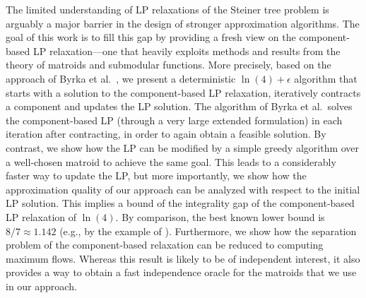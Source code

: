 \documentclass[11pt, letterpaper]{article}
\theoremstyle{definition}
\begin{document}
The limited understanding of LP relaxations of the
Steiner tree problem is arguably a major barrier in the design
of stronger approximation algorithms.
The goal of this work is to fill this gap by providing a fresh
view on the component-based LP relaxation---one that heavily
exploits methods and results from the theory of matroids
and submodular functions.
More precisely, based on the approach of Byrka
et al.~\cite{byrka_2011_steiner}, we present a deterministic
$\ln(4)+\epsilon$ algorithm
that starts with a solution to the component-based LP relaxation,
iteratively contracts a component and updates the LP
solution.
The algorithm of Byrka et al.~solves the
component-based LP (through a very large extended formulation)
in each iteration after contracting, in order to again obtain
a feasible solution.
By contrast, we show how
the LP can be modified by a simple greedy algorithm over
a well-chosen matroid to achieve the same goal.
This leads to a considerably faster way to update the
LP, but more importantly, we show how the approximation
quality of our approach can be analyzed  with respect
to the initial LP solution.
This implies a bound of the integrality gap of the component-based LP
relaxation of $\ln(4)$.
By comparison, the best known lower bound is $8/7 \approx 1.142$ (e.g., by the example of
 \cite{koenemann_2011_partition_based_LP}). Furthermore, we show how the separation problem of the
component-based relaxation can be reduced to computing maximum flows.
Whereas this result is likely to be of independent interest,
it also provides a way to obtain a fast
independence oracle for the matroids
that we use in our approach.
\end{document}
